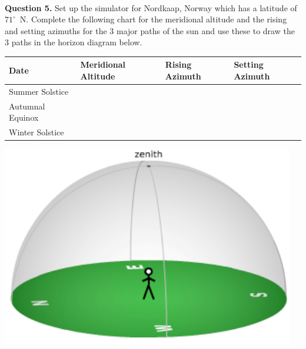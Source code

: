 \documentclass[11pt]{article}
\begin{document}
\enlargethispage*{1000pt}
\hrulefill\\
\newpage
\noindent
\textbf{Question 5.}
Set up the simulator for Nordkaap, Norway which has a latitude of $71^\circ$~N. Complete the following chart for the meridional altitude and the rising and setting azimuths for the 3 major paths of the sun and use these to draw the 3 paths in the horizon diagram below.
\begin{center}
\begin{tabular}{|l||l|l|l|}
\hline
\textbf{Date} & \textbf{Meridional Altitude} & \textbf{Rising Azimuth} & \textbf{Setting Azimuth} \\\hline\hline
Summer Solstice  & \parbox{0.12\linewidth}{\vspace*{1cm}} & \parbox{0.12\linewidth}{\vspace*{1cm}} & \parbox{0.12\linewidth}{\vspace*{1cm}} \\\hline
Autumnal Equinox & \parbox{0.12\linewidth}{\vspace*{1cm}} & \parbox{0.12\linewidth}{\vspace*{1cm}} & \parbox{0.12\linewidth}{\vspace*{1cm}} \\\hline
Winter Solstice  & \parbox{0.12\linewidth}{\vspace*{1cm}} & \parbox{0.12\linewidth}{\vspace*{1cm}} & \parbox{0.12\linewidth}{\vspace*{1cm}} \\\hline
\end{tabular}
\end{center}
\begin{center}
\includegraphics{local_sky}
\end{center}
\newpage
\end{document}
